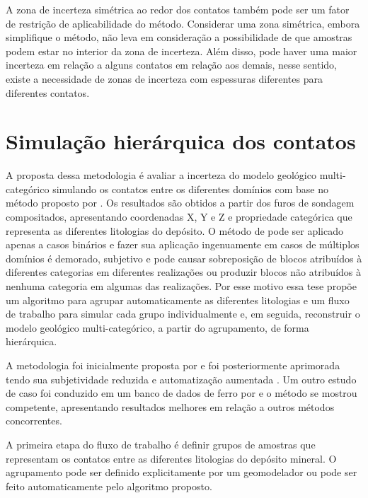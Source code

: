 A zona de incerteza simétrica ao redor dos contatos também pode ser um fator de restrição de aplicabilidade do método. Considerar uma zona simétrica, embora simplifique o método, não leva em consideração a possibilidade de que amostras podem estar no interior da zona de incerteza. Além disso, pode haver uma maior incerteza em relação a alguns contatos em relação aos demais, nesse sentido, existe a necessidade de zonas de incerteza com espessuras diferentes para diferentes contatos.

\section{Simulação hierárquica dos contatos}\label{hier_bound_sim}

A proposta dessa metodologia é avaliar a incerteza do modelo geológico multi-categórico simulando os contatos entre os diferentes domínios com base no método proposto por . Os resultados são obtidos a partir dos furos de sondagem compositados, apresentando coordenadas X, Y e Z e propriedade categórica que representa as diferentes litologias do depósito. O método de  pode ser aplicado apenas a casos binários e fazer sua aplicação ingenuamente em casos de múltiplos domínios é demorado, subjetivo e pode causar sobreposição de blocos atribuídos à diferentes categorias em diferentes realizações ou produzir blocos não atribuídos à nenhuma categoria em algumas das realizações. Por esse motivo essa tese propõe um algoritmo para agrupar automaticamente as diferentes litologias e um fluxo de trabalho para simular cada grupo individualmente e, em seguida, reconstruir o modelo geológico multi-categórico, a partir do agrupamento, de forma hierárquica. 

A metodologia foi inicialmente proposta por  e foi posteriormente aprimorada tendo sua subjetividade reduzida e automatização aumentada \cite{amarante2021boundary}. Um outro estudo de caso foi conduzido em um banco de dados de ferro por  e o método se mostrou competente, apresentando resultados melhores em relação a outros métodos concorrentes.

A primeira etapa do fluxo de trabalho é definir grupos de amostras que representam os contatos entre as diferentes litologias do depósito mineral. O agrupamento pode ser definido explicitamente por um geomodelador ou pode ser feito automaticamente pelo algoritmo proposto.

